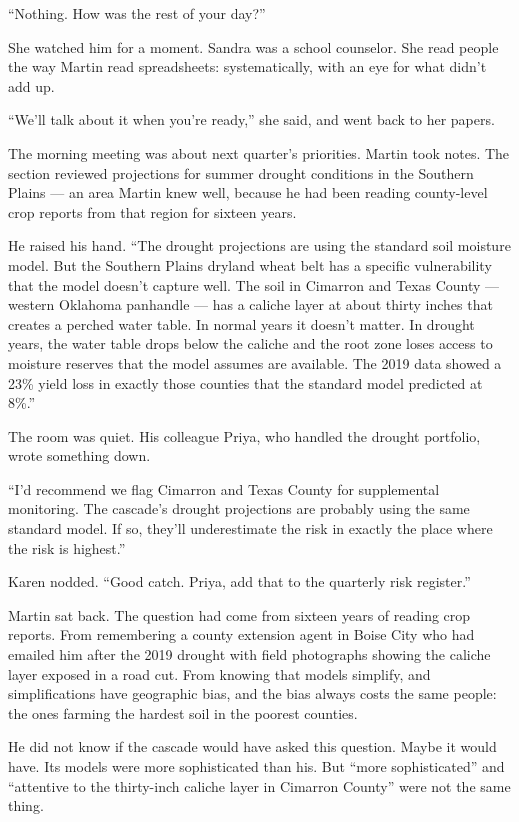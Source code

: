 ``Nothing. How was the rest of your day?''

She watched him for a moment. Sandra was a school counselor. She read people the way Martin read spreadsheets: systematically, with an eye for what didn't add up.

``We'll talk about it when you're ready,'' she said, and went back to her papers.


The morning meeting was about next quarter's priorities. Martin took notes. The section reviewed projections for summer drought conditions in the Southern Plains --- an area Martin knew well, because he had been reading county-level crop reports from that region for sixteen years.

He raised his hand. ``The drought projections are using the standard soil moisture model. But the Southern Plains dryland wheat belt has a specific vulnerability that the model doesn't capture well. The soil in Cimarron and Texas County --- western Oklahoma panhandle --- has a caliche layer at about thirty inches that creates a perched water table. In normal years it doesn't matter. In drought years, the water table drops below the caliche and the root zone loses access to moisture reserves that the model assumes are available. The 2019 data showed a 23\% yield loss in exactly those counties that the standard model predicted at 8\%.''

The room was quiet. His colleague Priya, who handled the drought portfolio, wrote something down.

``I'd recommend we flag Cimarron and Texas County for supplemental monitoring. The cascade's drought projections are probably using the same standard model. If so, they'll underestimate the risk in exactly the place where the risk is highest.''

Karen nodded. ``Good catch. Priya, add that to the quarterly risk register.''

Martin sat back. The question had come from sixteen years of reading crop reports. From remembering a county extension agent in Boise City who had emailed him after the 2019 drought with field photographs showing the caliche layer exposed in a road cut. From knowing that models simplify, and simplifications have geographic bias, and the bias always costs the same people: the ones farming the hardest soil in the poorest counties.

He did not know if the cascade would have asked this question. Maybe it would have. Its models were more sophisticated than his. But ``more sophisticated'' and ``attentive to the thirty-inch caliche layer in Cimarron County'' were not the same thing.

